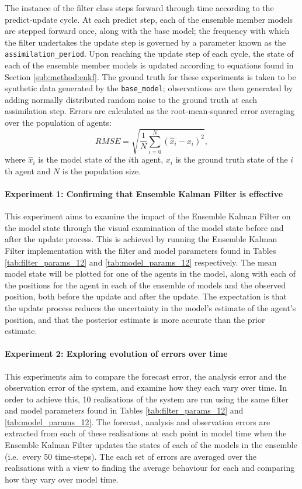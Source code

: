 The instance of the filter class steps forward through time according to the
predict-update cycle.
At each predict step, each of the ensemble member models are stepped forward
once, along with the base model; the frequency with which the filter undertakes
the update step is governed by a parameter known as the
\texttt{assimilation\_period}.
Upon reaching the update step of each cycle, the state of each of the ensemble
member models is updated according to equations found in Section
\ref{sub:method:enkf}.
The ground truth for these experiments is taken to be synthetic data generated
by the \texttt{base\_model}; observations are then generated by adding normally
distributed random noise to the ground truth at each assimilation step.
Errors are calculated as the root-mean-squared error averaging over the
population of agents:
\begin{equation*}
    RMSE = \sqrt{\frac{1}{N} \sum_{i=0}^{N}
    \left( \hat{x}_i - x_i \right) ^{2}},
\end{equation*}
where $\hat{x}_i$ is the model state of the $i$th agent, $x_i$ is the ground
truth state of the $i$th agent and $N$ is the population size.

\paragraph{Experiment 1: Confirming that Ensemble Kalman Filter is effective}

This experiment aims to examine the impact of the Ensemble Kalman Filter on the
model state through the visual examination of the model state before and after
the update process.
This is achieved by running the Ensemble Kalman Filter implementation with the
filter and model parameters found in Tables \ref{tab:filter_params_12} and
\ref{tab:model_params_12} respectively.
The mean model state will be plotted for one of the agents in the model, along
with each of the positions for the agent in each of the ensemble of models and
the observed position, both before the update and after the update.
The expectation is that the update process reduces the uncertainty in the
model's estimate of the agent's position, and that the posterior estimate is
more accurate than the prior estimate.

\paragraph{Experiment 2: Exploring evolution of errors over time}

This experiments aim to compare the forecast error, the analysis error
and the observation error of the system, and examine how they each vary over
time.
In order to achieve this, 10 realisations of the system are run using the same
filter and model parameters found in Tables \ref{tab:filter_params_12} and
\ref{tab:model_params_12}.
The forecast, analysis and observation errors are extracted from each of these
realisations at each point in model time when the Ensemble Kalman Filter updates
the states of each of the models in the ensemble (i.e.\ every 50 time-steps).
The each set of errors are averaged over the realisations with a view to finding
the average behaviour for each and comparing how they vary over model time.

